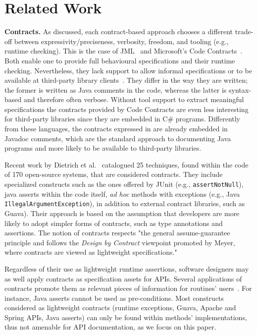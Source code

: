 \section{Related Work}
\label{sec:relatedWork}

\textbf{Contracts.} 
As discussed, each contract-based approach choo\-ses a different trade-off between expressivity/preciseness, verbosity, freedom, and tooling (e.g., runtime checking).
This is the case of JML~\cite{jml} and Microsoft's Code Contracts~\cite{codeContractsPaper}.
Both enable one to provide full behavioural specifications and their runtime checking.
Nevertheless, they lack support to allow informal specifications or to be available at third-party
library clients~\cite{Parnas2011}. They differ in the way they are written; the former is written as Java comments in the code, whereas the latter is syntax-based and therefore often verbose. 
Without tool support to extract meaningful specifications the contracts provided by Code Contracts are even less interesting for third-party libraries since they are embedded in C\# programs. Differently from these languages, the contracts expressed in \contractjdoc{} are already embedded in Javadoc comments, which are the standard approach to documenting Java programs and more likely to be available to third-party libraries.

Recent work by Dietrich et al.~\cite{Dietrich2017} catalogued 25 techniques, found within the code of 170 open-source systems, that are considered contracts. They include specialized constructs such as the ones offered by JUnit (e.g., \texttt{assertNotNull}), java asserts within the code itself, \emph{ad hoc} methods with exceptions (e.g., Java \texttt{IllegalArgumentException}), in addition to external contract libraries, such as Guava). 
Their approach is based on the assumption that developers are more likely to adopt simpler forms of contracts, such as type annotations and assertions. The notion of contracts respects "the general assume-guarantee principle and follows the \emph{Design by Contract} viewpoint promoted by Meyer, where contracts are viewed as lightweight specifications."~\cite{dbc} 

Regardless of their use as lightweight runtime assertions, software designers may as well apply contracts as specification assets for APIs. Several applications of contracts promote them as relevant pieces of information for routines' users~\cite{docAnalysis}. For instance, Java asserts cannot be used as pre-conditions. Most constructs considered as lightweight contracts (runtime exceptions, Guava, Apache and Spring APIs, Java asserts) can only be found within methods' implementations, thus not amenable for API documentation, as we focus on this paper.

